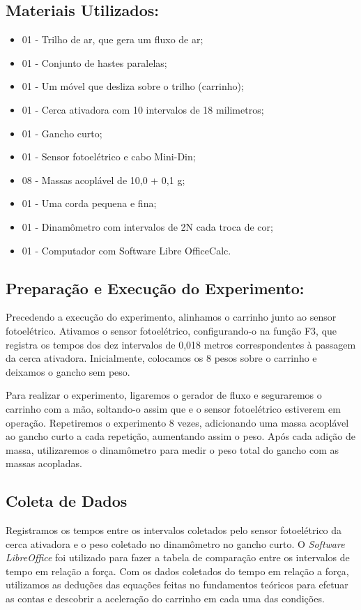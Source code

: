 \documentclass[article,12pt,oneside,a4paper,brazil]{abntex2}
\begin{document}
	\subsection{Materiais Utilizados:}
	\begin{adjustwidth}{1cm}{0cm}
		\begin{itemize}
			\item 01 - Trilho de ar, que gera um fluxo de ar;
			\item 01 - Conjunto de hastes paralelas;
			\item 01 - Um móvel que desliza sobre o trilho (carrinho);
			\item 01 - Cerca ativadora com 10 intervalos de 18 milimetros;
			\item 01 - Gancho curto;
			\item 01 - Sensor fotoelétrico e cabo Mini-Din;
			\item 08 - Massas acoplável de 10,0 + 0,1 g;
			\item 01 - Uma corda pequena e fina;
			\item 01 - Dinamômetro com intervalos de 2N cada troca de cor;	
			\item 01 - Computador com Software Libre OfficeCalc.
	\end{itemize}
	\end{adjustwidth}

	\subsection{Preparação e Execução do Experimento:}
	
	Precedendo a execução do experimento, alinhamos o carrinho junto ao sensor
	fotoelétrico. Ativamos o sensor fotoelétrico, configurando-o na função F3, que registra os tempos dos dez intervalos de 0,018 metros correspondentes à passagem da cerca ativadora. Inicialmente, colocamos os 8 pesos sobre o carrinho e deixamos o gancho sem peso.
	
	Para realizar o experimento, ligaremos o gerador de fluxo e seguraremos o carrinho com a mão, soltando-o assim que e o sensor fotoelétrico estiverem em operação. Repetiremos o experimento 8 vezes, adicionando uma massa acoplável ao gancho curto a cada repetição, aumentando assim o peso. Após cada adição de massa, utilizaremos o dinamômetro para medir o peso total do gancho com as massas acopladas.
		
	\subsection{Coleta de Dados}
	
	Registramos os tempos entre os intervalos coletados pelo sensor fotoelétrico da cerca ativadora e o peso coletado no dinamômetro no gancho curto. O \textit{Software LibreOffice} foi utilizado para fazer a tabela de comparação entre os intervalos de tempo em relação a força. Com os dados coletados do tempo em relação a força, utilizamos as deduções das equações feitas no fundamentos teóricos para efetuar as contas e descobrir a aceleração do carrinho em cada uma das condições.
\end{document}
